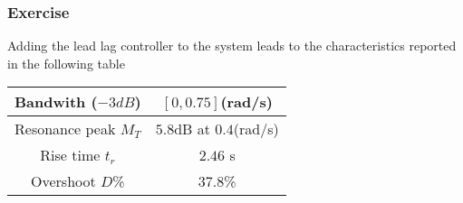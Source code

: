 \subsubsection{Exercise}
\label{exo412}

Adding the lead lag controller to the system leads to the characteristics reported in the following table

\begin{center}
\begin{tabular}{|c|c|}
    \hline
    Bandwith ($-3dB$) & $[0,0.75]$(rad/s)\\
    \hline
    Resonance peak $M_T$ & $5.8$dB at $0.4$(rad/s)\\
    \hline
    Rise time $t_r$ & $2.46$ s\\
    \hline
    Overshoot $D$\% & $37.8$\%\\
    \hline
\end{tabular}
\end{center}

